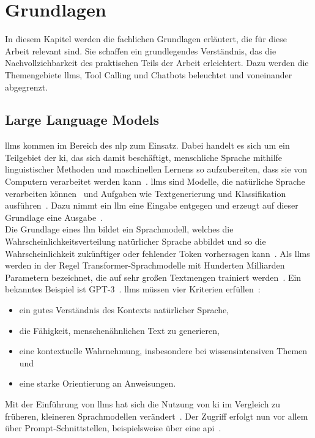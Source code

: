 \chapter{Grundlagen}\label{ch:grundlagen}

In diesem Kapitel werden die fachlichen Grundlagen erläutert, die für diese Arbeit relevant sind. Sie schaffen ein grundlegendes Verständnis, das die
Nachvollziehbarkeit des praktischen Teils der Arbeit erleichtert. Dazu werden die Themengebiete \acp{llm}, Tool Calling und Chatbots beleuchtet und 
voneinander abgegrenzt.

\section{Large Language Models}

\acp{llm} kommen im Bereich des \ac{nlp} zum Einsatz. Dabei handelt es sich um ein Teilgebiet der \ac{ki}, das sich damit beschäftigt, menschliche Sprache 
mithilfe linguistischer Methoden und maschinellen Lernens so aufzubereiten, dass sie von Computern verarbeitet werden kann~\cite[2967]{cb01}. \acp{llm}
sind Modelle, die natürliche Sprache verarbeiten können~\cite[378]{llm01} und Aufgaben wie Textgenerierung und Klassifikation ausführen~\cite[2968]{cb01}\cite[95]{llm02}.
Dazu nimmt ein \ac{llm} eine Eingabe entgegen und erzeugt auf dieser Grundlage eine Ausgabe~\cite[378]{llm01}. \\
Die Grundlage eines \ac{llm} bildet ein Sprachmodell, welches die Wahrscheinlichkeitsverteilung natürlicher Sprache abbildet und so die Wahrscheinlichkeit zukünftiger 
oder fehlender Token vorhersagen kann~\cite[1]{llm09}. Als \acp{llm} werden in der Regel Transformer-Sprachmodelle mit Hunderten Milliarden Parametern bezeichnet, 
die auf sehr großen Textmengen trainiert werden~\cite[4]{llm09}. Ein bekanntes Beispiel ist GPT-3~\cite[4]{llm09}. \acp{llm} müssen vier Kriterien 
erfüllen~\cite[1]{pi2}:

\begin{itemize}
  \item ein gutes Verständnis des Kontexts natürlicher Sprache,
  \item die Fähigkeit, menschenähnlichen Text zu generieren,
  \item eine kontextuelle Wahrnehmung, insbesondere bei wissensintensiven Themen und
  \item eine starke Orientierung an Anweisungen.
\end{itemize}

Mit der Einführung von \acp{llm} hat sich die Nutzung von \ac{ki} im Vergleich zu früheren, kleineren Sprachmodellen verändert~\cite[3]{llm09}. Der Zugriff erfolgt 
nun vor allem über Prompt-Schnittstellen, beispielsweise über eine \ac{api}~\cite[3]{llm09}. 

